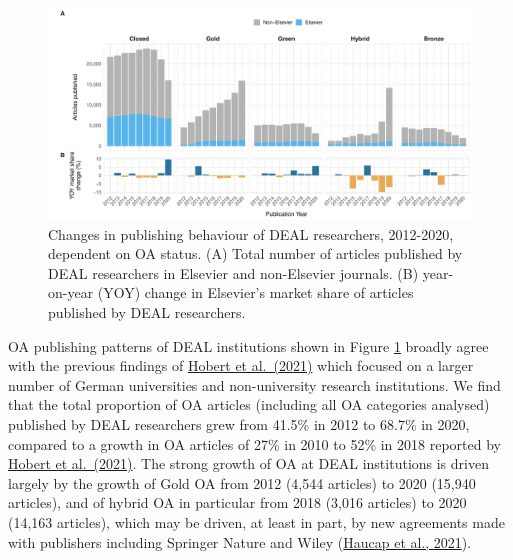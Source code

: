 \documentclass[
]{article}
\begin{document}
\begin{figure}

{\centering \includegraphics{analysis_files/figure-latex/items-publisher-year-oa-1} 

}

\caption{Changes in publishing behaviour of DEAL researchers, 2012-2020, dependent on OA status. (A) Total number of articles published by DEAL researchers in Elsevier and non-Elsevier journals. (B) year-on-year (YOY) change in Elsevier's market share of articles published by DEAL researchers.}\label{fig:items-publisher-year-oa}
\end{figure}

OA publishing patterns of DEAL institutions shown in Figure \ref{fig:items-publisher-year-oa} broadly agree with the previous findings of \href{https://doi.org/10.1007/s11192-021-04002-0}{Hobert et al.~(2021)} which focused on a larger number of German universities and non-university research institutions. We find that the total proportion of OA articles (including all OA categories analysed) published by DEAL researchers grew from 41.5\% in 2012 to 68.7\% in 2020, compared to a growth in OA articles of 27\% in 2010 to 52\% in 2018 reported by \href{https://doi.org/10.1007/s11192-021-04002-0}{Hobert et al.~(2021)}. The strong growth of OA at DEAL institutions is driven largely by the growth of Gold OA from 2012 (4,544 articles) to 2020 (15,940 articles), and of hybrid OA in particular from 2018 (3,016 articles) to 2020 (14,163 articles), which may be driven, at least in part, by new agreements made with publishers including Springer Nature and Wiley (\href{https://www.cesifo.org/en/publikationen/2021/working-paper/impact-german-deal-competition-academic-publishing-market}{Haucap et al., 2021}).
\end{document}

